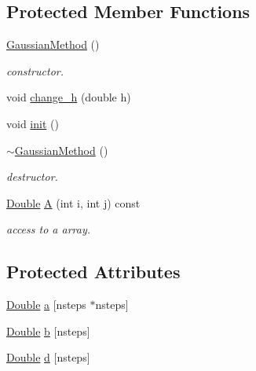\subsection*{Protected Member Functions}
\begin{DoxyCompactItemize}
\item 
\hyperlink{classSymplectikRK_1_1GaussianMethod_3_01nsteps_00_01long_01double_01_4_af5c075f1d7e3dce1867e6646d04bca02}{Gaussian\-Method} ()
\begin{DoxyCompactList}\small\item\em constructor. \end{DoxyCompactList}\item 
void \hyperlink{classSymplectikRK_1_1GaussianMethod_3_01nsteps_00_01long_01double_01_4_a9732b2e4262cff5aa6dc2aa76606c4eb}{change\-\_\-h} (double h)
\item 
void \hyperlink{classSymplectikRK_1_1GaussianMethod_3_01nsteps_00_01long_01double_01_4_a272115d3bd89f88e1c459e62bdf87044}{init} ()
\item 
\hyperlink{classSymplectikRK_1_1GaussianMethod_3_01nsteps_00_01long_01double_01_4_a686455ffce7d23ce51c724b1c54f4c7f}{$\sim$\-Gaussian\-Method} ()
\begin{DoxyCompactList}\small\item\em destructor. \end{DoxyCompactList}\item 
\hyperlink{classSymplectikRK_1_1GaussianMethod_3_01nsteps_00_01long_01double_01_4_a69c2e112cef22bfa9b7b1133dc426794}{Double} \hyperlink{classSymplectikRK_1_1GaussianMethod_3_01nsteps_00_01long_01double_01_4_ad4ac9a295ab1e060f0786e8400c8cf4f}{A} (int i, int j) const 
\begin{DoxyCompactList}\small\item\em access to a array. \end{DoxyCompactList}\end{DoxyCompactItemize}
\subsection*{Protected Attributes}
\begin{DoxyCompactItemize}
\item 
\hyperlink{classSymplectikRK_1_1GaussianMethod_3_01nsteps_00_01long_01double_01_4_a69c2e112cef22bfa9b7b1133dc426794}{Double} \hyperlink{classSymplectikRK_1_1GaussianMethod_3_01nsteps_00_01long_01double_01_4_ad0139c8e401d01a4567bdfd87a704e4f}{a} \mbox{[}nsteps $\ast$nsteps\mbox{]}
\item 
\hyperlink{classSymplectikRK_1_1GaussianMethod_3_01nsteps_00_01long_01double_01_4_a69c2e112cef22bfa9b7b1133dc426794}{Double} \hyperlink{classSymplectikRK_1_1GaussianMethod_3_01nsteps_00_01long_01double_01_4_a48e2da4387971199a4e29708014af888}{b} \mbox{[}nsteps\mbox{]}
\item 
\hyperlink{classSymplectikRK_1_1GaussianMethod_3_01nsteps_00_01long_01double_01_4_a69c2e112cef22bfa9b7b1133dc426794}{Double} \hyperlink{classSymplectikRK_1_1GaussianMethod_3_01nsteps_00_01long_01double_01_4_a557dd00c45d89ad23ea81416711665d7}{d} \mbox{[}nsteps\mbox{]}
\end{DoxyCompactItemize}


